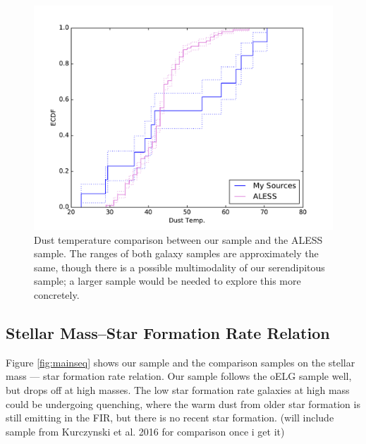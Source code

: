 \documentclass[preprint,natbib209]{aastex}
\begin{document}
\begin{figure}[t]
\centering
\includegraphics[scale=0.8]{ecdf_tdust.pdf}
\caption{Dust temperature comparison between our sample and the ALESS sample. The ranges of both galaxy samples are approximately the same, though there is a possible multimodality of our serendipitous sample; a larger sample would be needed to explore this more concretely.}
\label{fig:tdust}
\end{figure}

\subsection{Stellar Mass--Star Formation Rate Relation}

Figure \ref{fig:mainseq} shows our sample and the comparison samples on the stellar mass --- star formation rate relation. Our sample follows the oELG sample well, but drops off at high masses. The low star formation rate galaxies at high mass could be undergoing quenching, where the warm dust from older star formation is still emitting in the FIR, but there is no recent star formation. (will include sample from Kurczynski et al. 2016 for comparison once i get it)
\end{document}
